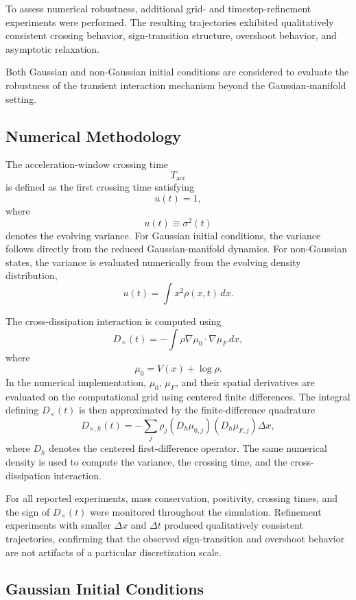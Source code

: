 \documentclass[aps,prl,twocolumn,10pt,superscriptaddress]{revtex4-2}
\begin{document}
To assess numerical robustness, additional grid- and timestep-refinement experiments were performed. The resulting trajectories exhibited qualitatively consistent crossing behavior, sign-transition structure, overshoot behavior, and asymptotic relaxation.

Both Gaussian and non-Gaussian initial conditions are considered to evaluate the robustness of the transient interaction mechanism beyond the Gaussian-manifold setting.

\subsection{Numerical Methodology}

The acceleration-window crossing time
\[
T_{\mathrm{acc}}
\]
is defined as the first crossing time satisfying
\[
u(t)=1,
\]
where
\[
u(t)\equiv\sigma^2(t)
\]
denotes the evolving variance. For Gaussian initial conditions, the variance follows directly from the reduced Gaussian-manifold dynamics. For non-Gaussian states, the variance is evaluated numerically from the evolving density distribution,
\[
u(t)
=
\int x^2\rho(x,t)\,dx.
\]

The cross-dissipation interaction is computed using
\[
D_\times(t)
=
-
\int
\rho
\nabla\mu_0
\cdot
\nabla\mu_F
\,dx,
\]
where
\[
\mu_0=V(x)+\log\rho.
\]
In the numerical implementation, $\mu_0$, $\mu_F$, and their spatial derivatives are evaluated on the computational grid using centered finite differences. The integral defining $D_\times(t)$ is then approximated by the finite-difference quadrature
\[
D_{\times,h}(t)
=
-
\sum_j
\rho_j
\left(D_h\mu_{0,j}\right)
\left(D_h\mu_{F,j}\right)
\Delta x,
\]
where $D_h$ denotes the centered first-difference operator. The same numerical density is used to compute the variance, the crossing time, and the cross-dissipation interaction.

For all reported experiments, mass conservation, positivity, crossing times, and the sign of $D_\times(t)$ were monitored throughout the simulation. Refinement experiments with smaller $\Delta x$ and $\Delta t$ produced qualitatively consistent trajectories, confirming that the observed sign-transition and overshoot behavior are not artifacts of a particular discretization scale.

\subsection{Gaussian Initial Conditions}
\end{document}
